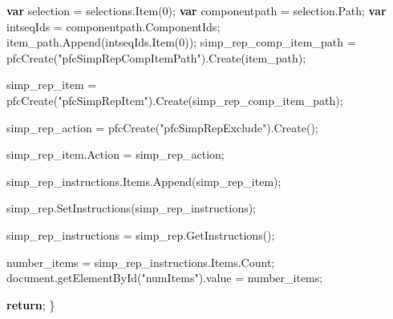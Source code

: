 \documentclass[]{article}
\newenvironment{Shaded}{}{}
\newcommand{\KeywordTok}[1]{\textcolor[rgb]{0.00,0.44,0.13}{\textbf{{#1}}}}
\newcommand{\DecValTok}[1]{\textcolor[rgb]{0.25,0.63,0.44}{{#1}}}
\newcommand{\StringTok}[1]{\textcolor[rgb]{0.25,0.44,0.63}{{#1}}}
\newcommand{\OtherTok}[1]{\textcolor[rgb]{0.00,0.44,0.13}{{#1}}}
\newcommand{\FunctionTok}[1]{\textcolor[rgb]{0.02,0.16,0.49}{{#1}}}
\newcommand{\NormalTok}[1]{{#1}}
\begin{document}
\begin{Shaded}
\begin{Highlighting}[]
  \KeywordTok{var} \NormalTok{selection = }\OtherTok{selections}\NormalTok{.}\FunctionTok{Item}\NormalTok{(}\DecValTok{0}\NormalTok{);}
  \KeywordTok{var} \NormalTok{componentpath = }\OtherTok{selection}\NormalTok{.}\FunctionTok{Path}\NormalTok{;}
  \KeywordTok{var} \NormalTok{intseqIds = }\OtherTok{componentpath}\NormalTok{.}\FunctionTok{ComponentIds}\NormalTok{;}
  \OtherTok{item_path}\NormalTok{.}\FunctionTok{Append}\NormalTok{(}\OtherTok{intseqIds}\NormalTok{.}\FunctionTok{Item}\NormalTok{(}\DecValTok{0}\NormalTok{));}
  \NormalTok{simp_rep_comp_item_path = }\FunctionTok{pfcCreate}\NormalTok{(}\StringTok{"pfcSimpRepCompItemPath"}\NormalTok{).}\FunctionTok{Create}\NormalTok{(item_path);}
  
  \NormalTok{simp_rep_item = }\FunctionTok{pfcCreate}\NormalTok{(}\StringTok{"pfcSimpRepItem"}\NormalTok{).}\FunctionTok{Create}\NormalTok{(simp_rep_comp_item_path);}
  
  \NormalTok{simp_rep_action = }\FunctionTok{pfcCreate}\NormalTok{(}\StringTok{"pfcSimpRepExclude"}\NormalTok{).}\FunctionTok{Create}\NormalTok{();}
  
  \OtherTok{simp_rep_item}\NormalTok{.}\FunctionTok{Action} \NormalTok{= simp_rep_action;}
  
  \OtherTok{simp_rep_instructions}\NormalTok{.}\OtherTok{Items}\NormalTok{.}\FunctionTok{Append}\NormalTok{(simp_rep_item);}
  
  \OtherTok{simp_rep}\NormalTok{.}\FunctionTok{SetInstructions}\NormalTok{(simp_rep_instructions);}
  
  \NormalTok{simp_rep_instructions = }\OtherTok{simp_rep}\NormalTok{.}\FunctionTok{GetInstructions}\NormalTok{();}
  
  \NormalTok{number_items = }\OtherTok{simp_rep_instructions}\NormalTok{.}\OtherTok{Items}\NormalTok{.}\FunctionTok{Count}\NormalTok{;}
  \OtherTok{document}\NormalTok{.}\FunctionTok{getElementById}\NormalTok{(}\StringTok{"numItems"}\NormalTok{).}\FunctionTok{value} \NormalTok{= number_items; }
  
  \KeywordTok{return}\NormalTok{;}
\NormalTok{\}}

\end{Highlighting}
\end{Shaded}
\end{document}
